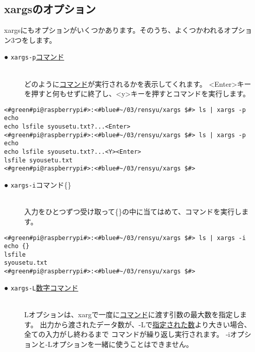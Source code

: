 \subsection{xargsのオプション}
xargsにもオプションがいくつかあります。そのうち、よくつかわれるオプション3つをします。

\begin{description}
    \item[● \texttt{xargs}\textvisiblespace \texttt{-p}\textvisiblespace \underline{コマンド}]\mbox{}\\
    どのように\underline{コマンド}が実行されるかを表示してくれます。
    <Enter>キーを押すと何もせずに終了し、<y>キーを押すとコマンドを実行します。
\end{description}

\begin{lstlisting}[caption=xargsコマンドのオプションp]
<#green#pi@raspberrypi#>:<#blue#~/03/rensyu/xargs $#> ls | xargs -p echo
echo lsfile syousetu.txt?...<Enter>
<#green#pi@raspberrypi#>:<#blue#~/03/rensyu/xargs $#> ls | xargs -p echo
echo lsfile syousetu.txt?...<Y><Enter>
lsfile syousetu.txt
<#green#pi@raspberrypi#>:<#blue#~/03/rensyu/xargs $#>
\end{lstlisting}

\begin{description}
    \item[● \texttt{xargs}\textvisiblespace \texttt{-i}\textvisiblespace コマンド\textvisiblespace \{\}]\mbox{}\\
    入力をひとつずつ受け取って\{\}の中に当てはめて、コマンドを実行します。
\end{description}

\begin{lstlisting}[caption=xargsコマンドのオプションi]
<#green#pi@raspberrypi#>:<#blue#~/03/rensyu/xargs $#> ls | xargs -i echo {}
lsfile
syousetu.txt
<#green#pi@raspberrypi#>:<#blue#~/03/rensyu/xargs $#>
\end{lstlisting}

\begin{description}
    \item[● \texttt{xargs}\textvisiblespace \texttt{-L}\textvisiblespace\underline{数字}\textvisiblespace\underline{コマンド}]\mbox{}\\
    Lオプションは、xargで一度に\underline{コマンド}に渡す引数の最大数を指定します。
    出力から渡されたデータ数が、-Lで\underline{指定された数}より大きい場合、全ての入力がし終わるまで
    コマンドが繰り返し実行されます。
    -iオプションと-Lオプションを一緒に使うことはできません。
\end{description}

